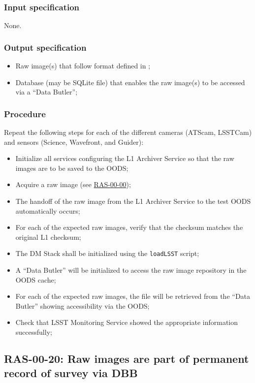 \documentclass[DM,lsstdraft,STS,toc]{lsstdoc}
\begin{document}
\subsubsection{Input specification}


None.


\subsubsection{Output specification}
\begin{itemize}
\item{Raw image(s) that follow format defined in ;}
\item{Database (may be SQLite file) that enables the raw image(s) to be accessed via a ``Data Butler'';}
\end{itemize}


\subsubsection{Procedure}
Repeat the following steps for each of the different cameras (ATScam, LSSTCam) and sensors (Science, Wavefront, and Guider):
\begin{itemize}
\item{Initialize all services configuring the L1 Archiver Service so that the raw images are to be saved to the OODS;}
\item{Acquire a raw image (see \hyperref[ras-00-00]{RAS-00-00});}
\item{The handoff of the raw image from the L1 Archiver Service to the test OODS automatically occurs;}
\item{For each of the expected raw images, verify that the checksum matches the original L1 checksum;}
\item{The DM Stack shall be initialized using the \texttt{loadLSST} script;}
\item{A ``Data Butler'' will be initialized to access the raw image repository in the OODS cache;}
\item{For each of the expected raw images, the file will be retrieved from the ``Data Butler'' showing accessibility via the OODS;}
\item{Check that LSST Monitoring Service showed the appropriate information successfully;}
\end{itemize}




\subsection{RAS-00-20: Raw images are part of permanent record of survey via DBB}
\label{ras-00-20}
\end{document}
